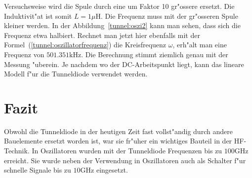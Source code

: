 \begin{refsection}
Versuchsweise wird die Spule durch eine um Faktor 10 gr"ossere ersetzt. 
Die Induktivit"at ist somit $L=1\mu\text{H}$. 
Die Frequenz muss mit der gr"osseren Spule kleiner werden. 
In der Abbildung~\ref{tunnel:oszi2} kann man sehen, dass sich die Frequenz etwa halbiert.
Rechnet man jetzt hier ebenfalls mit der Formel~(\ref{tunnel:oszillatorfrequenz}) die Kreisfrequenz $\omega$, erh"alt man eine Frequenz von $501.351\text{kHz}$.
Die Berechnung stimmt ziemlich genau mit der Messung "uberein.
Je nachdem wo der DC-Arbeitspunkt liegt, kann das lineare Modell f"ur die Tunneldiode verwendet werden.


\section{Fazit}
Obwohl die Tunneldiode in der heutigen Zeit fast vollst"andig durch andere Bauelemente ersetzt worden ist, war sie fr"uher ein wichtiges Bauteil in der HF-Technik.
In Oszillatoren wurden mit der Tunneldiode Frequenzen bis zu $100\text{GHz}$ erreicht.
Sie wurde neben der Verwendung in Oszillatoren auch als Schalter f"ur schnelle Signale bis zu $10\text{GHz}$ eingesetzt.

\printbibliography[heading=subbibliography]
\end{refsection}

